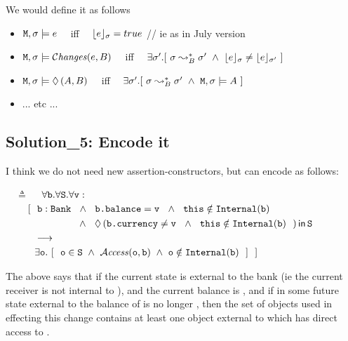 \documentclass[acmsmall,screen]{acmart}
\begin{document}
We would define it as follows

\begin{itemize}
\item
${\mbox{\tt{M}}},  \sigma \models e$ \ \ iff \ \  ${\lfloor{ {e}}\rfloor_{\sigma}} = true$ // ie as in July version
\item
${\mbox{\tt{M}}}, \sigma \models \mathcal{C}\textrm{\textit{hanges}}(e,B) $  \ \ iff \ \  $\exists \sigma'.  [\ \sigma \leadsto_B^* \sigma' \ \wedge \ \interp{e}{\sigma}\neq \interp{e}{\sigma'}\ ]$
\item
${\mbox{\tt{M}}}, \sigma \models  \lozenge\, (A,B)$   \ \ iff \ \     $\exists \sigma'.  [\ \sigma \leadsto_B^* \sigma'\  \wedge\ \M, \sigma \models A\ ]$
\item
... etc ...
\end{itemize}

\subsection{Solution\_5: Encode it}

I think we do not need new assertion-constructors, but can encode as follows:
\vspace{.1in}

\noindent 
  \ \  $\triangleq$ \ \
  $\forall {\mbox{\tt{b}}}.\forall {\mbox{\tt{S}}}.\forall {\mbox{\tt{v}}}:$\\
  $\strut \hspace{.3in} [ \ \ \prg{b}:
  \prg{Bank} \ \  \wedge\ \ \prg{b.balance}=\prg{v}  \ \  \wedge\ \ \this\notin\prg{Internal}(\prg{b})$\\
 $\strut \hspace{0.999in}  \wedge \ \  \Using{\Future{(\prg{b.currency}\neq \prg{v} \ \  \wedge\ \ \this\notin\prg{Internal}(\prg{b})\ \ )}}{\prg{S}} \ \ \  $
 \\
  $\strut  \hspace{.4in}  \longrightarrow $\\  
  $\strut  \hspace{.4in}   \exists \prg{o}. \ [ \ \
  \prg{o}\in \prg{S}\   \wedge\  \CanAccess{\prg{o}}{\prg{b}}\ \wedge\     \prg{o}\notin\prg{Internal}(\prg{b})  
\ \ ] \ \ ]$

The above says that if  the current state is external to the bank  (ie  the current receiver is not internal to   ), and the current balance is , and  if in some future state  external to   the balance of  is no longer , then the set of objects used in effecting this change contains at least one object  external to  which has direct access to .
\end{document}
